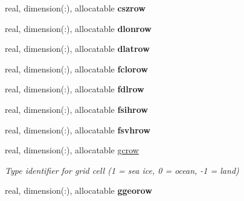 \begin{DoxyCompactItemize}
\item 
\hypertarget{structclass__statevars_1_1class__rotated_a52bc33fb32f3c598e8fef4eb567ca8e9}{}real, dimension(\+:), allocatable {\bfseries cszrow}\label{structclass__statevars_1_1class__rotated_a52bc33fb32f3c598e8fef4eb567ca8e9}

\item 
\hypertarget{structclass__statevars_1_1class__rotated_a47c114c0ab94c1f90d0e56d1a829cd11}{}real, dimension(\+:), allocatable {\bfseries dlonrow}\label{structclass__statevars_1_1class__rotated_a47c114c0ab94c1f90d0e56d1a829cd11}

\item 
\hypertarget{structclass__statevars_1_1class__rotated_ad7b3b95cebc805afaf84209e9b0c2594}{}real, dimension(\+:), allocatable {\bfseries dlatrow}\label{structclass__statevars_1_1class__rotated_ad7b3b95cebc805afaf84209e9b0c2594}

\item 
\hypertarget{structclass__statevars_1_1class__rotated_abd82d60330ee13d4a600d346005ca453}{}real, dimension(\+:), allocatable {\bfseries fclorow}\label{structclass__statevars_1_1class__rotated_abd82d60330ee13d4a600d346005ca453}

\item 
\hypertarget{structclass__statevars_1_1class__rotated_a89d59ced8bcec768d707c90e7ca459c1}{}real, dimension(\+:), allocatable {\bfseries fdlrow}\label{structclass__statevars_1_1class__rotated_a89d59ced8bcec768d707c90e7ca459c1}

\item 
\hypertarget{structclass__statevars_1_1class__rotated_a5827dcc3eb9eee13aee431e0145a1ddc}{}real, dimension(\+:), allocatable {\bfseries fsihrow}\label{structclass__statevars_1_1class__rotated_a5827dcc3eb9eee13aee431e0145a1ddc}

\item 
\hypertarget{structclass__statevars_1_1class__rotated_a2ebf0a695ba62fe1528193cce1e3a199}{}real, dimension(\+:), allocatable {\bfseries fsvhrow}\label{structclass__statevars_1_1class__rotated_a2ebf0a695ba62fe1528193cce1e3a199}

\item 
\hypertarget{structclass__statevars_1_1class__rotated_a9eda78bafa090fe83cc29bd7ff0df294}{}real, dimension(\+:), allocatable \hyperlink{structclass__statevars_1_1class__rotated_a9eda78bafa090fe83cc29bd7ff0df294}{gcrow}\label{structclass__statevars_1_1class__rotated_a9eda78bafa090fe83cc29bd7ff0df294}

\begin{DoxyCompactList}\small\item\em Type identifier for grid cell (1 = sea ice, 0 = ocean, -\/1 = land) \end{DoxyCompactList}\item 
\hypertarget{structclass__statevars_1_1class__rotated_ae9bded3620ecb0fde8bfd79ec385a648}{}real, dimension(\+:), allocatable {\bfseries ggeorow}\label{structclass__statevars_1_1class__rotated_ae9bded3620ecb0fde8bfd79ec385a648}


\end{DoxyCompactItemize}
